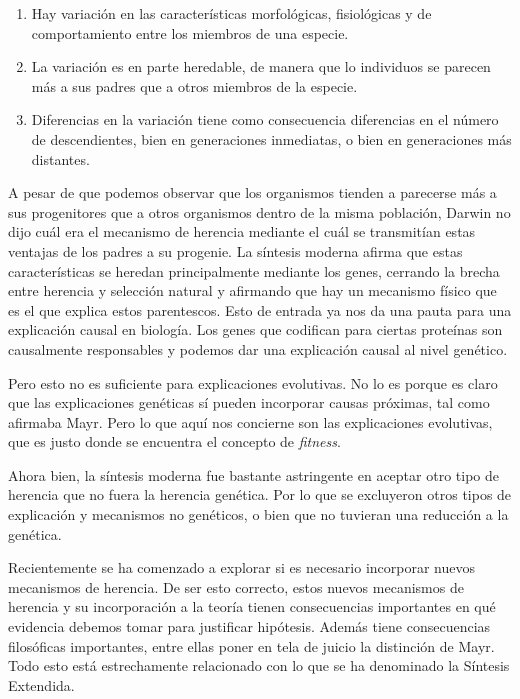 \begin{enumerate}
  \item Hay variación en las características morfológicas, fisiológicas y de comportamiento entre los miembros de una especie.
  \item La variación es en parte heredable, de manera que lo individuos se parecen más a sus padres que a otros miembros de la especie.
  \item Diferencias en la variación tiene como consecuencia diferencias en el número de descendientes, bien en generaciones inmediatas, o bien en generaciones más distantes\cite{Godfrey-Smith2013}.
\end{enumerate}

A pesar de que podemos observar que los organismos tienden a parecerse más a sus progenitores que a otros organismos dentro de la misma población, Darwin no dijo cuál era el mecanismo de herencia mediante el cuál se transmitían estas ventajas de los padres a su progenie. La síntesis moderna afirma que estas características se heredan principalmente mediante los genes, cerrando la brecha entre herencia y selección natural y afirmando que hay un mecanismo físico que es el que explica estos parentescos. Esto de entrada ya nos da una pauta para una explicación causal en biología. Los genes que codifican para ciertas proteínas son causalmente responsables y podemos dar una explicación causal al nivel genético.

Pero esto no es suficiente para explicaciones evolutivas. No lo es porque es claro que las explicaciones genéticas sí pueden incorporar causas próximas, tal como afirmaba Mayr. Pero lo que aquí nos concierne son las explicaciones evolutivas, que es justo donde se encuentra el concepto de \emph{fitness}.

Ahora bien, la síntesis moderna fue bastante astringente en aceptar otro tipo de herencia que no fuera la herencia genética. Por lo que se excluyeron otros tipos de explicación y mecanismos no genéticos, o bien que no tuvieran una reducción a la genética.

Recientemente se ha comenzado a explorar si es necesario incorporar nuevos mecanismos de herencia. De ser esto correcto, estos nuevos mecanismos de herencia y su incorporación a la teoría tienen consecuencias importantes en qué evidencia debemos tomar para justificar hipótesis. Además tiene consecuencias filosóficas importantes, entre ellas poner en tela de juicio la distinción de Mayr. Todo esto está estrechamente relacionado con lo que se ha denominado la Síntesis Extendida.


